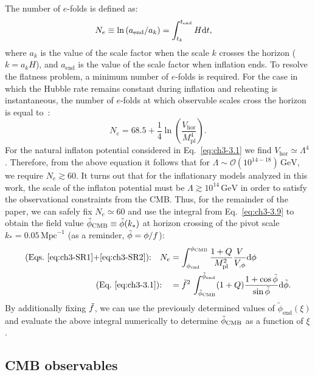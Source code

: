 The number of $e$-folds is defined as:
\begin{align}
    \label{eq:ch3-3.9}
    N_{e} \equiv \ln \left(a_{\mathrm{end}} / a_{k}\right)&=\int^{t_{\mathrm{end}}}_{t_{k}} H {\rm d} t,
\end{align}
where $a_k$ is the value of the scale factor when the scale $k$ crosses the horizon ($k=a_k H$), and $a_\mathrm{end}$ is the value of the scale factor when inflation ends. To resolve the flatness problem, a minimum number of $e$-folds is required. For the case in which the Hubble rate remains constant during inflation and reheating is instantaneous, the number of $e$-folds at which observable scales cross the horizon is equal to~\cite{Liddle:2003as}:
\begin{equation}
    N_{e}=68.5 +\frac{1}{4}\ln\left(\frac{V_{\mathrm{hor}}}{M_{\mathrm{pl}}^4}\right) .
\end{equation}
For the natural inflaton potential considered in Eq.~\ref{eq:ch3-3.1} we find $V_{\mathrm{hor}}\simeq \Lambda^4$. Therefore, from the above equation it follows that for $\Lambda\sim\mathcal{O}(10^{14-18})\,\mathrm{GeV}$, we require $N_e\gtrsim 60$. It turns out that for the inflationary models analyzed in this work, the scale of the inflaton potential must be $\Lambda \gtrsim 10^{14}\,\mathrm{GeV}$ in order to satisfy the observational constraints from the CMB. Thus, for the remainder of the paper, we can safely fix $N_e\simeq 60$ and use the integral from Eq.~\ref{eq:ch3-3.9} to obtain the field value $\Tilde{\phi}_{\mathrm{CMB}}\equiv \Tilde{\phi}(k_*) $ at horizon
crossing of the pivot scale $k_* = 0.05\,\mathrm{Mpc}^{-1}$ (as a reminder, $\Tilde{\phi} = \phi/f$):
\begin{align}
\text{(Eqs.~\ref{eq:ch3-SR1}+\ref{eq:ch3-SR2}):} \quad N_e &=\int_{\phi_{\mathrm{end }}}^{\phi_{\mathrm{CMB}}} \frac{1+Q}{M_{\mathrm{pl}}^{2}} \frac{V}{V_{, \phi}} {\rm d} \phi \\
\text{(Eq.~\ref{eq:ch3-3.1}):} \quad &=\Tilde{f}^2\,\int_{\Tilde{\phi}_{\mathrm{CMB}}}^{\Tilde{\phi}_{\mathrm{end}}} (1+Q) \frac{1+\cos \Tilde{\phi}}{\sin \Tilde{\phi}} {\rm d} \Tilde{\phi}.
\end{align}
By additionally fixing $\Tilde{f}$, we can use the previously determined values of $\tilde{\phi}_{\mathrm{end}}(\xi)$ and evaluate the above integral numerically to determine $\Tilde{\phi}_{\mathrm{CMB}}$ as a function of $\xi$.

\subsection{CMB observables}
\label{sec:ch3-3.3}

